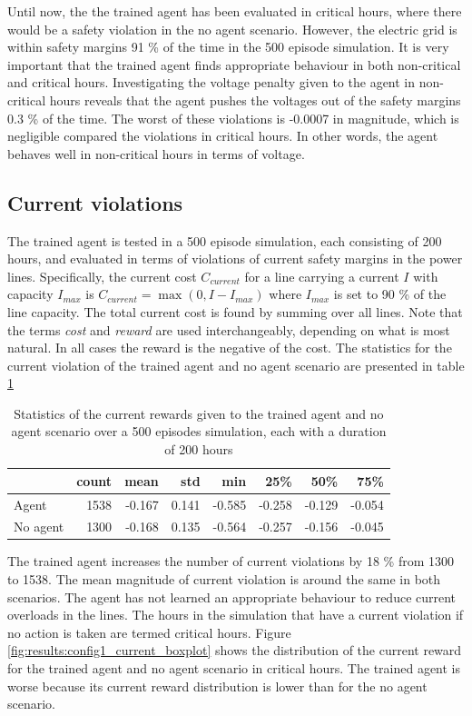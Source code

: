 \documentclass[class=book, crop=false, 11pt]{standalone}
\begin{document}
Until now, the the trained agent has been evaluated in critical hours, where there would be a safety violation in the no agent scenario. However, the electric grid is within safety margins 91 \% of the time in the 500 episode simulation. It is very important that the trained agent finds appropriate behaviour in both non-critical and critical hours. Investigating the voltage penalty given to the agent in non-critical hours reveals that the agent pushes the voltages out of the safety margins 0.3 \% of the time. The worst of these violations is -0.0007 in magnitude, which is negligible  compared the violations in critical hours. In other words, the agent behaves well in non-critical hours in terms of voltage. 


\subsection{Current violations}\label{section:config1:current_violations}
The trained agent is tested in a 500 episode simulation, each consisting of 200 hours, and evaluated in terms of violations of current safety margins in the power lines. Specifically, the current cost $C_{current}$ for a line carrying a current $I$ with capacity $I_{max}$ is $C_{current} = \max(0,I - I_{max})$ where $I_{max}$ is set to 90 \% of the line capacity. The total current cost is found by summing over all lines. Note that the terms \textit{cost} and \textit{reward} are used interchangeably, depending on what is most natural. In all cases the reward is the negative of the cost. The statistics for the current violation of the trained agent and no agent scenario are presented in table \ref{table:results:configuration1_reward_500_episodes_current}

\begin{table}[h]
\center
\caption{Statistics of the current rewards given to the trained agent and no agent scenario over a 500 episodes simulation, each with a duration of 200 hours}
\begin{tabular}{l|rrrrrrr}
         & count & mean   & std   & min    & 25\%   & 50\%   & 75\%   \\
\hline
Agent    & 1538  & -0.167 & 0.141 & -0.585 & -0.258 & -0.129 & -0.054 \\
No agent & 1300  & -0.168 & 0.135 & -0.564 & -0.257 & -0.156 & -0.045 \\
\hline
\end{tabular}
\label{table:results:configuration1_reward_500_episodes_current}
\end{table}
The trained agent increases the number of current violations by 18 \% from 1300 to 1538. The mean magnitude of current violation is around the same in both scenarios. The agent has not learned an appropriate behaviour to reduce current overloads in the lines. The hours in the simulation that have a current violation if no action is taken are termed critical hours. Figure \ref{fig:results:config1_current_boxplot} shows the distribution of the current reward for the trained agent and no agent scenario in critical hours. The trained agent is worse because its current reward distribution is lower than for the no agent scenario.
\end{document}
